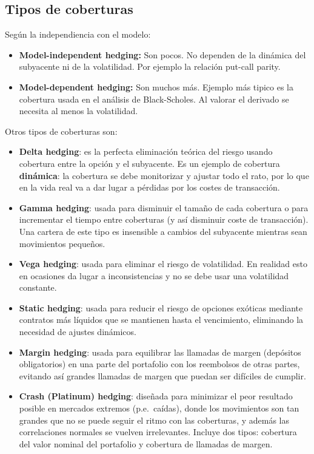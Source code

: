 \subsection{Tipos de coberturas}
Según la independiencia con el modelo:
\begin{itemize}
    \item \textbf{Model-independent hedging:} Son pocos. No dependen de la dinámica del subyacente ni de la volatilidad. Por ejemplo la relación put-call parity.
    \item \textbf{Model-dependent hedging:} Son muchos más. Ejemplo más tipico es la cobertura usada en el análisis de Black-Scholes. Al valorar el derivado se necesita al menos la volatilidad.
\end{itemize}
Otros tipos de coberturas son:
\begin{itemize}
    \item \textbf{Delta hedging}: es la perfecta eliminación teórica del riesgo usando cobertura entre la opción y el subyacente. Es un ejemplo de cobertura \textbf{dinámica}: la cobertura se debe monitorizar y ajustar todo el rato, por lo que en la vida real va a dar lugar a pérdidas por los costes de transacción.
    \item \textbf{Gamma hedging}: usada para disminuir el tamaño de cada cobertura o para incrementar el tiempo entre coberturas (y así disminuir coste de transacción). Una cartera de este tipo es insensible a cambios del subyacente mientras sean movimientos pequeños. 
    \item \textbf{Vega hedging}: usada para eliminar el riesgo de volatilidad. En realidad esto en ocasiones da lugar a inconsistencias y no se debe usar una volatilidad constante.
    \item \textbf{Static hedging}: usada para reducir el riesgo de opciones exóticas mediante contratos más líquidos que se mantienen hasta el vencimiento, eliminando la necesidad de ajustes dinámicos.
    \item \textbf{Margin hedging}: usada para equilibrar las llamadas de margen (depósitos obligatorios) en una parte del portafolio con los reembolsos de otras partes, evitando así grandes llamadas de margen que puedan ser difíciles de cumplir.
    \item \textbf{Crash (Platinum) hedging}: diseñada para minimizar el peor resultado posible en mercados extremos (p.e.\ caídas), donde los movimientos son tan grandes que no se puede seguir el ritmo con las coberturas, y además las correlaciones normales se vuelven irrelevantes. Incluye dos tipos: cobertura del valor nominal del portafolio y cobertura de llamadas de margen.
\end{itemize}






